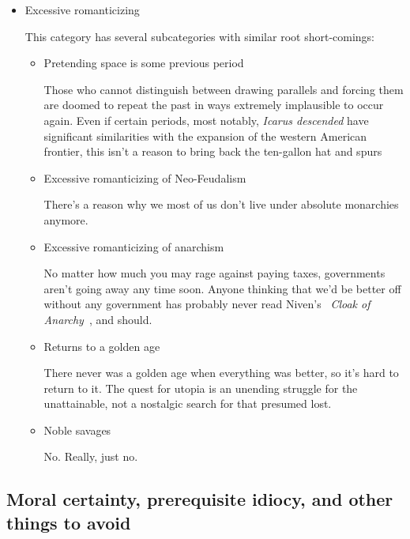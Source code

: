 \begin{itemize}
\item Excessive romanticizing

This category has several subcategories with similar root short-comings:
\begin{itemize}

\item Pretending space is some previous period

Those who cannot distinguish between drawing parallels and forcing
them are doomed to repeat the past in ways extremely implausible to
occur again. Even if certain periods, most notably, \emph{Icarus
descended} have significant similarities with the expansion of the
western American frontier, this isn't a reason to bring back the
ten-gallon hat and spurs

\item Excessive romanticizing of Neo-Feudalism

There's a reason why we most of us don't live under absolute
monarchies anymore. 

\item Excessive romanticizing of anarchism

No matter how much you may rage against paying taxes, governments
aren't going away any time soon. Anyone thinking that we'd be better
off without any government has probably never read Niven's
~\emph{Cloak of Anarchy}~\cite{PurpleRobeofAnarchy}, and should.

\item Returns to a golden age

There never was a golden age when everything was better, so it's hard
to return to it. The quest for utopia is an unending struggle for the
unattainable, not a nostalgic search for that presumed lost.

\item Noble savages

No. Really, just no.

\end{itemize}

\end{itemize}

\subsection{Moral certainty, prerequisite idiocy, and other things to avoid} 

